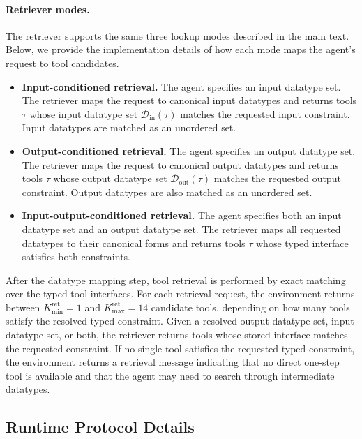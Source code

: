 \paragraph{Retriever modes.}
The retriever supports the same three lookup modes described in the main text. 
Below, we provide the implementation details of how each mode maps the agent's request to tool candidates.
\begin{itemize}
    \item \textbf{Input-conditioned retrieval.} The agent specifies an input datatype set. The retriever maps the request to canonical input datatypes and returns tools $\tau$ whose input datatype set $\mathcal{D}_{\mathrm{in}}(\tau)$ matches the requested input constraint. Input datatypes are matched as an unordered set.
    \item \textbf{Output-conditioned retrieval.} The agent specifies an output datatype set. The retriever maps the request to canonical output datatypes and returns tools $\tau$ whose output datatype set $\mathcal{D}_{\mathrm{out}}(\tau)$ matches the requested output constraint. Output datatypes are also matched as an unordered set.
    \item \textbf{Input-output-conditioned retrieval.} The agent specifies both an input datatype set and an output datatype set. The retriever maps all requested datatypes to their canonical forms and returns tools $\tau$ whose typed interface satisfies both constraints.
\end{itemize}

After the datatype mapping step, tool retrieval is performed by exact matching over the typed tool interfaces. 
For each retrieval request, the environment returns between $K_{\min}^{\mathrm{ret}}=1$ and $K_{\max}^{\mathrm{ret}}=14$ candidate tools, depending on how many tools satisfy the resolved typed constraint.
Given a resolved output datatype set, input datatype set, or both, the retriever returns tools whose stored interface matches the requested constraint.
If no single tool satisfies the requested typed constraint, the environment returns a retrieval message indicating that no direct one-step tool is available and that the agent may need to search through intermediate datatypes.

\subsection{Runtime Protocol Details}
\label{app:runtime-interaction-details}

